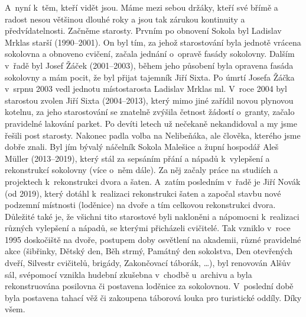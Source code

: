 \documentclass[a5paper, 11pt, twoside]{article}
\begin{document}
A~nyní k~těm, kteří vidět jsou. Máme mezi sebou držáky, kteří své břímě
a radost nesou většinou dlouhé roky a jsou tak zárukou kontinuity a
předvídatelnosti. Začněme starosty. Prvním po obnovení Sokola byl
Ladislav Mrklas starší (1990--2001). On byl tím, za jehož
starostování byla jednotě vrácena sokolovna a obnoveno cvičení, začala
jednání o~opravě fasády sokolovny. Dalším v~řadě byl Josef Žáček
(2001--2003), během jeho působení byla opravena fasáda
sokolovny a mám pocit, že byl přijat tajemník Jiří Sixta. Po úmrtí
Josefa Žáčka v~srpnu 2003 vedl jednotu místostarosta Ladislav Mrklas ml.
V~roce 2004 byl starostou zvolen Jiří Sixta (2004--2013),
který mimo jiné zařídil novou plynovou kotelnu, za jeho starostování se
znatelně zvýšila četnost žádostí o~granty, začalo pravidelné lakování
parket. Po devíti letech už nečekaně nekandidoval a my jsme řešili post
starosty. Nakonec padla volba na Nelibeňáka, ale člověka, kterého jsme
dobře znali. Byl jím bývalý náčelník Sokola Malešice a župní hospodář
Aleš Müller (2013--2019), který stál za sepsáním přání a
nápadů k~vylepšení a rekonstrukcí sokolovny (více o~něm dále). Za něj
začaly práce na studiích a projektech k~rekonstrukci dvora a šaten.
A~zatím posledním v~řadě je Jiří Novák (od 2019), který dotáhl k~realizaci
rekonstrukci šaten a započal stavbu nové podzemní místnosti (loděnice)
na dvoře a tím celkovou rekonstrukci dvora. Důležité také je, že všichni
tito starostové byli nakloněni a nápomocni k~realizaci různých vylepšení
a nápadů, se kterými přicházeli cvičitelé. Tak vzniklo v~roce 1995
doskočiště na dvoře, postupem doby osvětlení na akademii, různé
pravidelné akce (šibřinky, Dětský den, Běh strmý, Památný den sokolstva,
Den otevřených dveří, Silvestr cvičitelů, brigády, Zakončovací táborák,
\ldots), byl renovován Alšův sál, svépomocí vznikla hudební zkušebna
v~chodbě u~archivu a byla rekonstruována posilovna či postavena loděnice
za sokolovnou. V~poslední době byla postavena tahací věž či zakoupena
táborová louka pro turistické oddíly. Díky všem.
\end{document}
